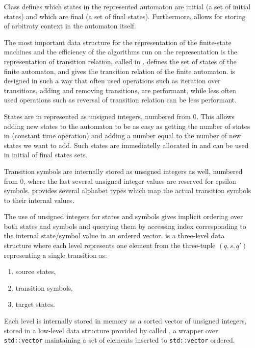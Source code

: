 Class \nfaClass defines which states in the represented automaton are initial (a set of initial states) and which are final (a set of final states).
Furthermore, \nfaClass allows for storing of arbitraty context in the automaton itself.

The most important data structure for the representation of the finite-state machines and the efficiency of the algorithms run on the representation is the representation of transition relation, called \deltastruct in \mata.
\deltastruct defines the set of states of the finite automaton, and gives the transition relation of the finite automaton.
\deltastruct is designed in such a way that often used operations such as iteration over transitions, adding and removing transitions, are performant, while less often used operations such as reversal of transition relation can be less performant.

States are in \mata represented as unsigned integers, numbered from 0.
This allows adding new states to the automaton to be as easy as getting the number of states in \deltastruct (constant time operation) and adding a number equal to the number of new states we want to add.
Such states are immediatelly allocated in \deltastruct and can be used in initial of final states sets.

Transition symbols are internally stored as unsigned integers as well, numbered from 0, where the last several unsigned integer values are reserved for epsilon symbols.
\mata provides several alphabet types which map the actual transition symbols to their internal values.

The use of unsigned integers for states and symbols gives implicit ordering over both states and symbols and querying them by accessing index corresponding to the internal state/symbol value in an ordered vector.
\deltastruct is a three-level data structure where each level represents one element from the three-tuple $(q, s, q')$ representing a single transition as:
\begin{enumerate}
    \item source states,
    \item transition symbols,
    \item target states.
\end{enumerate}

Each level is internally stored in memory as a sorted vector of unsigned integers, stored in a low-level data structure provided by \mata called \ordvector, a wrapper over \texttt{std::vector} maintaining a set of elements inserted to \texttt{std::vector} ordered.


